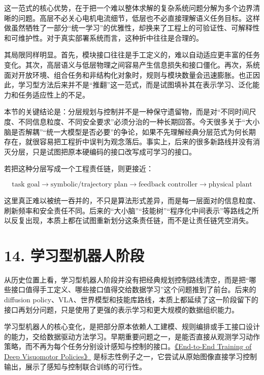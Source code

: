 这一范式的核心优势，在于把一个难以整体求解的复杂系统问题分解为多个边界清晰的问题。高层不必关心电机电流细节，低层也不必直接理解语义任务目标。这样做虽然牺牲了一部分“统一学习”的优雅性，却换来了工程上的可验证性、可解释性和可维护性。对于真实部署系统而言，这种折中往往是合理的。

其局限同样明显。首先，模块接口往往是手工定义的，难以自动适应更丰富的任务变化。其次，高层语义与低层物理之间容易产生信息损失和接口僵化。再次，系统面对开放环境、组合任务和非结构化对象时，规则与模块数量会迅速膨胀。也正因此，学习型方法后来并不是“推翻”这一范式，而是试图填补其在表示学习、泛化能力和任务适应性上的不足。

本节的关键结论是：分层规划与控制并不是一种保守遗留物，而是对“不同时间尺度、不同信息粒度、不同安全要求”必须分治的一种长期回答。今天很多关于“大小脑是否解耦”“统一大模型是否必要”的争论，如果不先理解经典分层范式为何长期存在，就很容易把工程折中误判为观念落后。事实上，后来的很多新路线并没有消灭分层，只是试图把原本硬编码的接口改写成可学习的接口。

若把这种分层写成一个工程责任链，则更接近：

\begingroup
\scriptsize
\begin{equation*}
\text{task goal} \rightarrow \text{symbolic/trajectory plan} \rightarrow \text{feedback controller} \rightarrow \text{physical plant}
\end{equation*}
\endgroup

这里真正难以被统一吞并的，不只是算法形式差异，而是每一层面对的信息粒度、刷新频率和安全责任不同。后来的“大小脑”“技能树”“程序化中间表示”等路线之所以反复出现，本质上都在试图重新划分这条责任链，而不是让责任链凭空消失。

\section*{14. 学习型机器人阶段}

从历史位置上看，学习型机器人阶段并没有把经典规划控制路线清空，而是把“哪些接口值得手工定义、哪些接口值得交给数据学习”这个问题推到了前台。后来的 diffusion policy、VLA、世界模型和技能库路线，本质上都延续了这一阶段留下的接口再划分问题，只是使用了更强的表示学习和更大规模的数据组织能力。

学习型机器人的核心变化，是把部分原本依赖人工建模、规则编排或手工接口设计的能力，交给数据驱动方法学习。早期重要问题之一，是能否直接从观测学习动作策略，而不再为每个任务分别设计感知与控制的接口。\href{https://arxiv.org/abs/1504.00702}{《End-to-End Training of Deep Visuomotor Policies》} 是标志性例子之一，它尝试从原始图像直接学习控制输出，展示了感知与控制联合训练的可行性。


